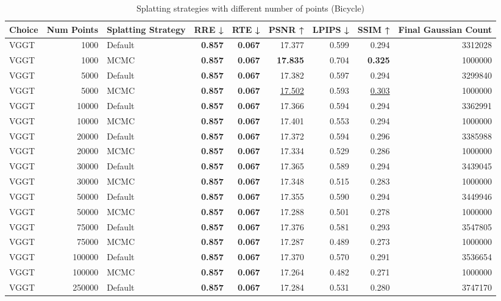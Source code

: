 \begin{table}[H]
\caption{Splatting strategies with different number of points (Bicycle)}
\label{tab:09_splatting_strategy_points_bicycle}
\begin{tabular}{lrlrrrrrr}
\toprule
Choice & Num Points & Splatting Strategy & RRE ↓ & RTE ↓ & PSNR ↑ & LPIPS ↓ & SSIM ↑ & Final Gaussian Count \\
\midrule
VGGT & 1000 & Default & \textbf{0.857} & \textbf{0.067} & 17.377 & 0.599 & 0.294 & 3312028 \\
VGGT & 1000 & MCMC & \textbf{0.857} & \textbf{0.067} & \textbf{17.835} & 0.704 & \textbf{0.325} & 1000000 \\
VGGT & 5000 & Default & \textbf{0.857} & \textbf{0.067} & 17.382 & 0.597 & 0.294 & 3299840 \\
VGGT & 5000 & MCMC & \textbf{0.857} & \textbf{0.067} & \underline{17.502} & 0.593 & \underline{0.303} & 1000000 \\
VGGT & 10000 & Default & \textbf{0.857} & \textbf{0.067} & 17.366 & 0.594 & 0.294 & 3362991 \\
VGGT & 10000 & MCMC & \textbf{0.857} & \textbf{0.067} & 17.401 & 0.553 & 0.294 & 1000000 \\
VGGT & 20000 & Default & \textbf{0.857} & \textbf{0.067} & 17.372 & 0.594 & 0.296 & 3385988 \\
VGGT & 20000 & MCMC & \textbf{0.857} & \textbf{0.067} & 17.334 & 0.529 & 0.286 & 1000000 \\
VGGT & 30000 & Default & \textbf{0.857} & \textbf{0.067} & 17.365 & 0.589 & 0.294 & 3439045 \\
VGGT & 30000 & MCMC & \textbf{0.857} & \textbf{0.067} & 17.348 & 0.515 & 0.283 & 1000000 \\
VGGT & 50000 & Default & \textbf{0.857} & \textbf{0.067} & 17.355 & 0.590 & 0.294 & 3449946 \\
VGGT & 50000 & MCMC & \textbf{0.857} & \textbf{0.067} & 17.288 & 0.501 & 0.278 & 1000000 \\
VGGT & 75000 & Default & \textbf{0.857} & \textbf{0.067} & 17.376 & 0.581 & 0.293 & 3547805 \\
VGGT & 75000 & MCMC & \textbf{0.857} & \textbf{0.067} & 17.287 & 0.489 & 0.273 & 1000000 \\
VGGT & 100000 & Default & \textbf{0.857} & \textbf{0.067} & 17.370 & 0.570 & 0.291 & 3536654 \\
VGGT & 100000 & MCMC & \textbf{0.857} & \textbf{0.067} & 17.264 & 0.482 & 0.271 & 1000000 \\
VGGT & 250000 & Default & \textbf{0.857} & \textbf{0.067} & 17.284 & 0.531 & 0.280 & 3747170 \\

\end{tabular}
\end{table}
